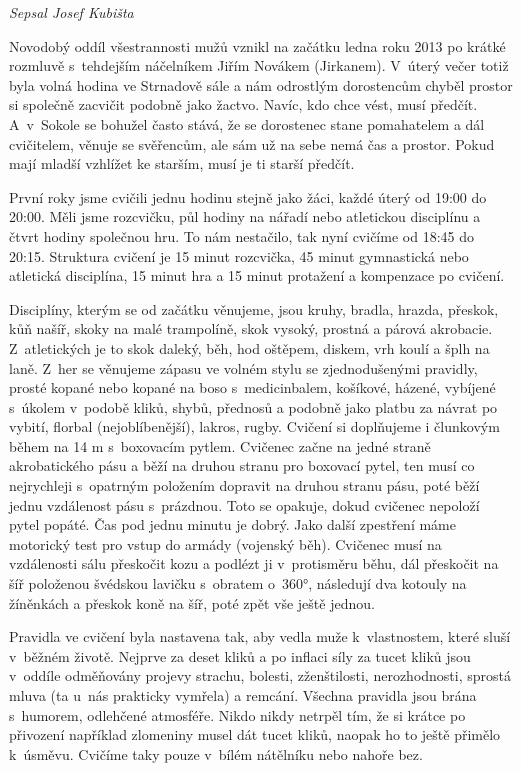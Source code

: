\documentclass[a5paper, 12pt, twoside]{article}
\begin{document}
\textit{Sepsal Josef Kubišta}

Novodobý oddíl všestrannosti mužů vznikl na začátku ledna roku 2013 po
krátké rozmluvě s~tehdejším náčelníkem Jiřím Novákem (Jirkanem). V~úterý
večer totiž byla volná hodina ve Strnadově sále a nám odrostlým
dorostencům chyběl prostor si společně zacvičit podobně jako žactvo.
Navíc, kdo chce vést, musí předčít. A~v~Sokole se bohužel často stává,
že se dorostenec stane pomahatelem a dál cvičitelem, věnuje se
svěřencům, ale sám už na sebe nemá čas a prostor. Pokud mají mladší
vzhlížet ke starším, musí je ti starší předčít.

První roky jsme cvičili jednu hodinu stejně jako žáci, každé úterý od
19:00 do 20:00. Měli jsme rozcvičku, půl hodiny na nářadí nebo
atletickou disciplínu a čtvrt hodiny společnou hru. To nám nestačilo,
tak nyní cvičíme od 18:45 do 20:15. Struktura cvičení je 15 minut
rozcvička, 45 minut gymnastická nebo atletická disciplína, 15 minut hra
a 15 minut protažení a kompenzace po cvičení.

Disciplíny, kterým se od začátku věnujeme, jsou kruhy, bradla, hrazda,
přeskok, kůň našíř, skoky na malé trampolíně, skok vysoký, prostná a
párová akrobacie. Z~atletických je to skok daleký, běh, hod oštěpem,
diskem, vrh koulí a šplh na laně. Z~her se věnujeme zápasu ve volném
stylu se zjednodušenými pravidly, prosté kopané nebo kopané na boso
s~medicinbalem, košíkové, házené, vybíjené s~úkolem v~podobě kliků, shybů,
přednosů a podobně jako platbu za návrat po vybití, florbal
(nejoblíbenější), lakros, rugby. Cvičení si doplňujeme i člunkovým během
na 14 m s~boxovacím pytlem. Cvičenec začne na jedné straně akrobatického
pásu a běží na druhou stranu pro boxovací pytel, ten musí co nejrychleji
s~opatrným položením dopravit na druhou stranu pásu, poté běží jednu
vzdálenost pásu s~prázdnou. Toto se opakuje, dokud cvičenec nepoloží
pytel popáté. Čas pod jednu minutu je dobrý. Jako další zpestření máme
motorický test pro vstup do armády (vojenský běh). Cvičenec musí na
vzdálenosti sálu přeskočit kozu a podlézt ji v~protisměru běhu, dál
přeskočit na šíř položenou švédskou lavičku s~obratem o~360°, následují
dva kotouly na žíněnkách a přeskok koně na šíř, poté zpět vše ještě
jednou.

Pravidla ve cvičení byla nastavena tak, aby vedla muže k~vlastnostem,
které sluší v~běžném životě. Nejprve za deset kliků a po inflaci síly za
tucet kliků jsou v~oddíle odměňovány projevy strachu, bolesti,
zženštilosti, nerozhodnosti, sprostá mluva (ta u~nás prakticky vymřela)
a remcání. Všechna pravidla jsou brána s~humorem, odlehčené atmosféře.
Nikdo nikdy netrpěl tím, že si krátce po přivození například zlomeniny
musel dát tucet kliků, naopak ho to ještě přimělo k~úsměvu. Cvičíme taky
pouze v~bílém nátělníku nebo nahoře bez.
\end{document}
